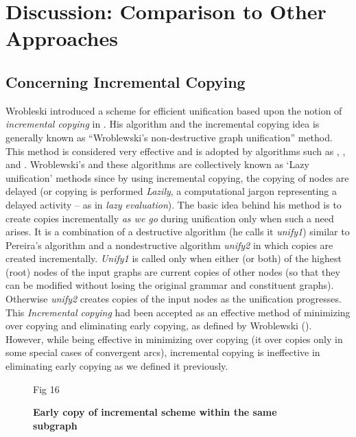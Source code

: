 \section{Discussion: Comparison to Other Approaches}
\subsection{Concerning Incremental Copying}
Wrobleski introduced a scheme for efficient unification based upon the
notion of {\it incremental copying} in \cite{Wroblewski}. His
algorithm and the incremental copying idea is generally known as
``Wroblewski's non-destructive graph unification'' method. 
This method is considered very effective and is adopted by algorithms
such as \cite{Kogure}, \cite{Kogure-Lazy}, \cite{Godden} and \cite{Emele}.
Wroblewski's and these algorithms are collectively known as `Lazy
unification' methods since by using incremental copying, the copying of nodes
are delayed (or copying is performed {\it Lazily}, a computational
jargon representing a delayed activity -- as in {\it lazy evaluation}).
The basic
idea behind his method is to create copies incrementally {\it as we go}
during unification only when such a need arises. It is a combination
of a destructive algorithm (he calls it {\it unify1}) similar to
Pereira's algorithm and a nondestructive algorithm {\it unify2} in
which copies are created incrementally.  {\it Unify1} is called only when
either (or both) of the highest (root) nodes of the input graphs are
current copies of other nodes (so that they can be modified without
losing the original grammar and constituent graphs). Otherwise {\it unify2}
creates copies of the input nodes as the unification progresses.  This
{\it Incremental copying} had been accepted as an effective method of
minimizing over copying and eliminating early copying, as defined by
Wroblewski (\cite{Wroblewski}).  However, while being effective in
minimizing over copying (it over copies only in some special cases of
convergent arcs), incremental copying is ineffective in eliminating
early copying as we defined it previously.



\begin{figure}[htb]
\epsfxsize 140mm
\epsfysize 200mm
\vspace*{3.5cm}
\hspace*{5cm}
\vspace*{3.5cm}
\vspace*{-20cm}
\hspace*{12cm}        Fig 16
\caption{{\bf Early copy of incremental scheme within the same
subgraph}}
\label{figure22}
\end{figure}


